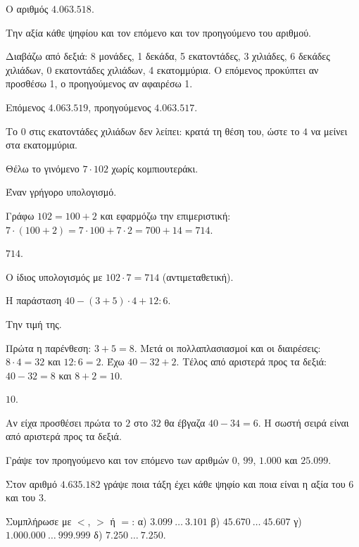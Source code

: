 
\tixero Ο αριθμός $4.063.518$.\par
\tithelo Την αξία κάθε ψηφίου και τον επόμενο και τον προηγούμενο του αριθμού.\par
\possindeo Διαβάζω από δεξιά: 8 μονάδες, 1 δεκάδα, 5 εκατοντάδες, 3 χιλιάδες, 6 δεκάδες χιλιάδων, 0 εκατοντάδες χιλιάδων, 4 εκατομμύρια. Ο επόμενος προκύπτει αν προσθέσω 1, ο προηγούμενος αν αφαιρέσω 1.\par
\apantisi Επόμενος $4.063.519$, προηγούμενος $4.063.517$.\par
\elegxos Το $0$ στις εκατοντάδες χιλιάδων δεν λείπει: κρατά τη θέση του, ώστε το $4$ να μείνει στα εκατομμύρια.

\tixero Θέλω το γινόμενο $7\cdot 102$ χωρίς κομπιουτεράκι.\par
\tithelo Έναν γρήγορο υπολογισμό.\par
\possindeo Γράφω $102=100+2$ και εφαρμόζω την επιμεριστική: $7\cdot(100+2)=7\cdot 100+7\cdot 2=700+14=714$.\par
\apantisi $714$.\par
\elegxos Ο ίδιος υπολογισμός με $102\cdot 7=714$ (αντιμεταθετική).

\tixero Η παράσταση $40-(3+5)\cdot 4+12:6$.\par
\tithelo Την τιμή της.\par
\possindeo Πρώτα η παρένθεση: $3+5=8$. Μετά οι πολλαπλασιασμοί και οι διαιρέσεις: $8\cdot 4=32$ και $12:6=2$. Έχω $40-32+2$. Τέλος από αριστερά προς τα δεξιά: $40-32=8$ και $8+2=10$.\par
\apantisi $10$.\par
\elegxos Αν είχα προσθέσει πρώτα το $2$ στο $32$ θα έβγαζα $40-34=6$. Η σωστή σειρά είναι από αριστερά προς τα δεξιά.



\ex Γράψε τον προηγούμενο και τον επόμενο των αριθμών $0$, $99$, $1.000$ και $25.099$.

\ex Στον αριθμό $4.635.182$ γράψε ποια τάξη έχει κάθε ψηφίο και ποια είναι η αξία του $6$ και του $3$.

\ex Συμπλήρωσε με $<$, $>$ ή $=$: α) $3.099\ \dots\ 3.101$ \quad β) $45.670\ \dots\ 45.607$ \quad γ) $1.000.000\ \dots\ 999.999$ \quad δ) $7.250\ \dots\ 7.250$.

